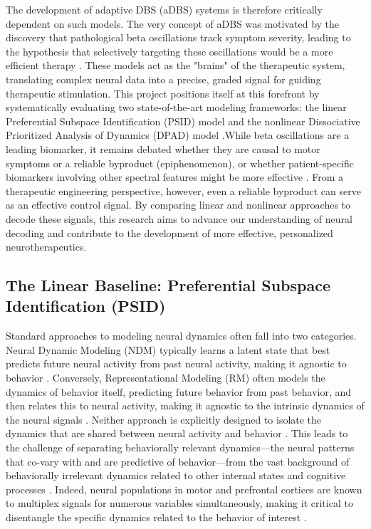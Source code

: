 \documentclass[12pt, a4paper]{article}
\begin{document}
The development of adaptive DBS (aDBS) systems is therefore critically dependent on such models. The very concept of aDBS was motivated by the discovery that pathological beta oscillations track symptom severity, leading to the hypothesis that selectively targeting these oscillations would be a more efficient therapy \parencite{littleAdaptiveDeepBrain2013}. These models act as the "brains" of the therapeutic system, translating complex neural data into a precise, graded signal for guiding therapeutic stimulation. This project positions itself at this forefront by systematically evaluating two state-of-the-art modeling frameworks: the linear Preferential Subspace Identification (PSID) model \parencite{saniModelingBehaviorallyRelevant2021} and the nonlinear Dissociative Prioritized Analysis of Dynamics (DPAD) model \parencite{saniDissociativePrioritizedModeling2024}.While beta oscillations are a leading biomarker, it remains debated whether they are causal to motor symptoms or a reliable byproduct (epiphenomenon), or whether patient-specific biomarkers involving other spectral features might be more effective \parencite{swannGammaOscillationsHyperkinetic2016}. From a therapeutic engineering perspective, however, even a reliable byproduct can serve as an effective control signal. By comparing linear and nonlinear approaches to decode these signals, this research aims to advance our understanding of neural decoding and contribute to the development of more effective, personalized neurotherapeutics.


\subsection{The Linear Baseline: Preferential Subspace Identification (PSID)}

Standard approaches to modeling neural dynamics often fall into two categories. Neural Dynamic Modeling (NDM) typically learns a latent state that best predicts future neural activity from past neural activity, making it agnostic to behavior \parencite{saniModelingBehaviorallyRelevant2021}. Conversely, Representational Modeling (RM) often models the dynamics of behavior itself, predicting future behavior from past behavior, and then relates this to neural activity, making it agnostic to the intrinsic dynamics of the neural signals \parencite{saniModelingBehaviorallyRelevant2021}. Neither approach is explicitly designed to isolate the dynamics that are shared between neural activity and behavior \parencite{saniModelingBehaviorallyRelevant2021}. This leads to the challenge of separating behaviorally relevant dynamics—the neural patterns that co-vary with and are predictive of behavior—from the vast background of behaviorally irrelevant dynamics related to other internal states and cognitive processes \parencite{saniModelingBehaviorallyRelevant2021}. Indeed, neural populations in motor and prefrontal cortices are known to multiplex signals for numerous variables simultaneously, making it critical to disentangle the specific dynamics related to the behavior of interest \parencite{manteContextdependentComputationRecurrent2013}.
\end{document}
